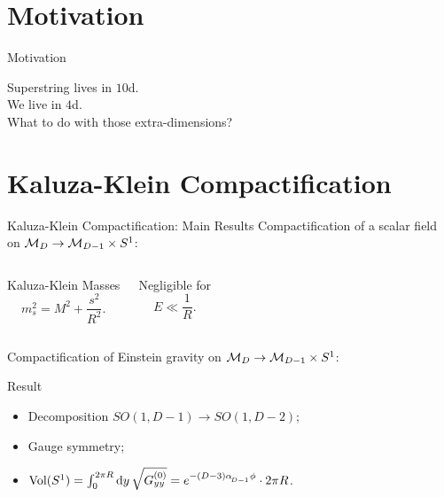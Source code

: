 \section{Motivation}
\begin{frame}{Motivation}
	\begin{center}
		Superstring lives in $10$d.\pause \\
		We live in $4$d.\\ \pause
		\alert{What to do with those extra-dimensions?}
	\end{center}
\end{frame}

\begin{frame}[standout]
	\color{White}{What Really is Spacetime?}
\end{frame}

\section{Kaluza-Klein Compactification}
\begin{frame}{Kaluza-Klein Compactification: Main Results}
	Compactification of a \alert{scalar field} on $\mathcal{M}_D \to \mathcal{M}_{D-1} \times S^1$:
	\begin{columns}
		\begin{block}{Kaluza-Klein Masses}
			\begin{equation*}
				m^2_s = M^2 + \frac{s^2}{R^2}.
			\end{equation*}
		\end{block}
		\begin{block}{Negligible for}
			\begin{equation*}
				E \ll \frac{1}{R}.
			\end{equation*}
		\end{block}
	\end{columns} \pause
	Compactification of \alert{Einstein gravity} on $\mathcal{M}_D \to \mathcal{M}_{D-1} \times S^1$:
	\begin{block}{Result}
		\begin{itemize}
			\item Decomposition $SO(1,D-1) \to SO(1,D-2)$;
			\item Gauge symmetry;
			\item $\textup{Vol} (S^1)  = \int_{0}^{2\pi R} \mathop{}\!\mathrm{d} y \, \sqrt{G^{(0)}_{yy}} = e^{-(D-3)\alpha_{\!_{D-1}} \phi} \cdot 2\pi R$.
		\end{itemize}
	\end{block}
\end{frame}

